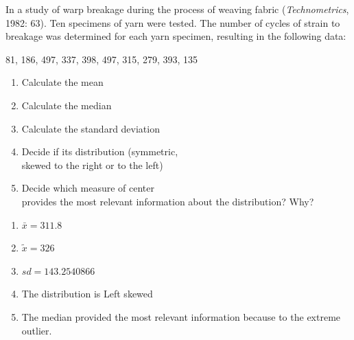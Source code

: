 \documentclass[11pt, chapterprefix=true]{scrbook}\usepackage[]{graphicx}\usepackage[]{color}
\begin{document}
\begin{exercises}
\begin{exercise}
\end{exercise}
\begin{solution}  %



\end{solution}


\begin{exercise} %


In a study of warp breakage during the process of weaving fabric (\textit{Technometrics}, 1982: 63).  Ten specimens of yarn were tested.  The number of cycles of strain to breakage was determined for each yarn specimen, resulting in the following data:

81, 186, 497, 337, 398, 497, 315, 279, 393, 135 

\begin{enumerate}
\item Calculate the mean
\item Calculate the median
\item Calculate the standard deviation
\item Decide if its distribution (symmetric, \\ skewed to the right or to the left)
\item Decide which measure of center \\ provides the most relevant information about the distribution? Why?
\end{enumerate}

\end{exercise}
\begin{solution}   %

\begin{enumerate}
\item $\bar{x} = 311.8$
\item $\tilde{x} = 326$
\item $sd = 143.2540866 $
\item The distribution is Left skewed
\item The median provided the most relevant information because to the extreme outlier.
\end{enumerate}


\end{solution}
\end{exercises}
\end{document}
